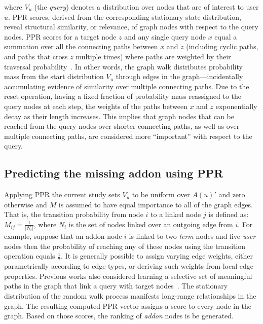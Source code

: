 \documentclass[10pt,letterpaper]{article}
\begin{document}
\noindent where $V_u$ (the \textit{query}) denotes a distribution over nodes that are of interest to user $u$. PPR scores, derived from the corresponding stationary state distribution, reveal structural similarity, or relevance, of graph nodes with respect to the query nodes. PPR scores for a target node $z$ and any single query node $x$ equal a summation over all the connecting paths between $x$ and $z$ (including cyclic paths, and paths that cross $z$ multiple times) where paths are weighted by their traversal probability~\cite{jeh2003scaling,fogaras2004towards}. In other words, the graph walk distributes probability mass from the start distribution $V_u$ through edges in the graph---incidentally accumulating evidence of similarity over multiple connecting paths. Due to the reset operation, having a fixed fraction of probability mass reassigned to the query nodes at each step, the weights of the paths between $x$ and $z$ exponentially decay as their length increases. This implies that graph nodes that can be reached from the query nodes over shorter connecting paths, as well as over multiple connecting paths, are considered more ``important'' with respect to the query.

\subsection*{Predicting the missing addon using PPR}

Applying PPR the current study sets $V_u$ to be uniform over $A(u)'$ and zero otherwise and $M$ is assumed to have equal importance to all of the graph edges. That is, the transition probability from node $i$ to a linked node $j$ is defined as: $M_{ij} = \frac{1}{|N_i|}$, where $N_i$ is the set of nodes linked over an outgoing edge from $i$. For example, suppose that an addon node $i$ is linked to two \textit{term} nodes and five \textit{user} nodes then the probability of reaching any of these nodes using the transition operation equals $\frac{1}{7}$. It is generally possible to assign varying edge weights, either parametrically according to edge types, or deriving such weights from local edge properties. Previous works also considered learning a selective set of meaningful paths in the graph that link a query with target nodes~\cite{minkov2010improving,lao2010relational}. The stationary distribution of the random walk process manifests long-range relationships in the graph. The resulting computed PPR vector assigns a score to every node in the graph. Based on those scores, the ranking of \textit{addon} nodes is be generated.   
\end{document}
